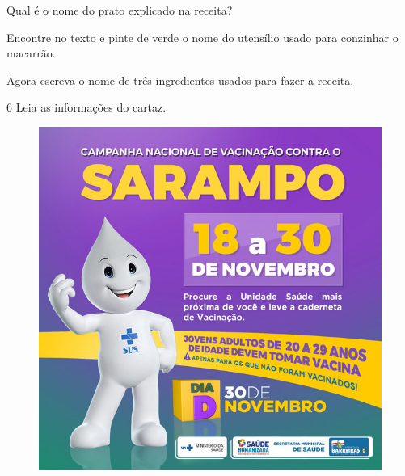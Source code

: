 
\begin{escolha}
\item Qual é o nome do prato explicado na receita?


\item Encontre no texto e pinte de verde o nome do utensílio usado para
conzinhar o macarrão.


\item Agora escreva o nome de três ingredientes usados para fazer a receita.

\end{escolha}

\num{6} Leia as informações do cartaz.


\begin{figure}[H]
\centering
\includegraphics[width=.7\textwidth]{media/image85.jpeg}
\end{figure}

